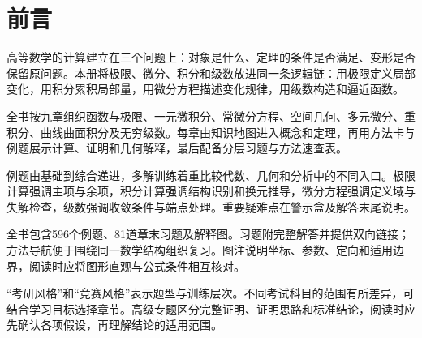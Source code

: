 \chapter{前言}
高等数学的计算建立在三个问题上：对象是什么、定理的条件是否满足、变形是否保留原问题。本册将极限、微分、积分和级数放进同一条逻辑链：用极限定义局部变化，用积分累积局部量，用微分方程描述变化规律，用级数构造和逼近函数。

全书按九章组织函数与极限、一元微积分、常微分方程、空间几何、多元微分、重积分、曲线曲面积分及无穷级数。每章由知识地图进入概念和定理，再用方法卡与例题展示计算、证明和几何解释，最后配备分层习题与方法速查表。

例题由基础到综合递进，多解训练着重比较代数、几何和分析中的不同入口。极限计算强调主项与余项，积分计算强调结构识别和换元推导，微分方程强调定义域与失解检查，级数强调收敛条件与端点处理。重要疑难点在警示盒及解答末尾说明。

全书包含596个例题、81道章末习题及解释图。习题附完整解答并提供双向链接；方法导航便于围绕同一数学结构组织复习。图注说明坐标、参数、定向和适用边界，阅读时应将图形直观与公式条件相互核对。

“考研风格”和“竞赛风格”表示题型与训练层次。不同考试科目的范围有所差异，可结合学习目标选择章节。高级专题区分完整证明、证明思路和标准结论，阅读时应先确认各项假设，再理解结论的适用范围。

